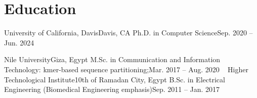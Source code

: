 \section{Education}
  \resumeSubHeadingListStart
    \resumeSubheading
      {University of California, Davis}{Davis, CA}
      {Ph.D. in Computer Science}{Sep. 2020 --  Jun. 2024}
      \resumeItemListStart
      \resumeItemListEnd

    \resumeSubheading
      {Nile University}{Giza, Egypt}
      {M.Sc. in Communication and Information Technology: kmer-based sequence partitioning;}{Mar. 2017 -- Aug. 2020}
\
    \resumeSubheading
      {Higher Technological Institute}{10th of Ramadan City, Egypt}
      {B.Sc. in Electrical Engineering (Biomedical Engineering emphasis)}{Sep. 2011 -- Jan. 2017}
      \resumeItemListStart
      \resumeItemListEnd

  \resumeSubHeadingListEnd
